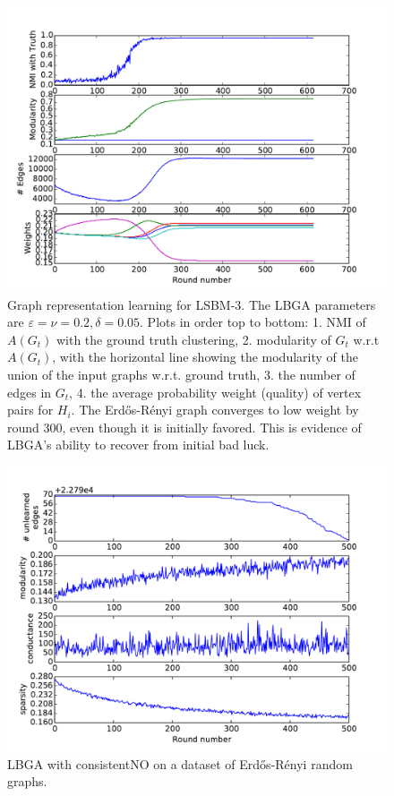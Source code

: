 \documentclass{IEEEtran}
\newcommand{\er}{Erd\H{o}s-R\'{e}nyi }
\begin{document}
\begin{figure}[t]
\begin{centering}
\includegraphics[width=\columnwidth]{figures/LBM-SNR=6+ER-consistentNO+NEF.pdf}
\par\end{centering}
\caption{Graph representation learning for LSBM-3. The LBGA parameters are
$\varepsilon=\nu=0.2, \delta=0.05$. Plots in order top to bottom: 1. NMI of
$A(G_t)$ with the ground truth clustering, 2. modularity of $G_t$ w.r.t
$A(G_t)$, with the horizontal line showing the modularity of the union of the
input graphs w.r.t. ground truth, 3. the number of edges in $G_t$, 4.  the
average probability weight (quality) of vertex pairs for $H_i$.  The \er graph
converges to low weight by round 300, even though it is initially favored. This
is evidence of LBGA's ability to recover from initial bad luck.} 
\label{fig:local-sbm} 
\end{figure}

\begin{figure}[t]
\begin{centering}
\includegraphics[width=\columnwidth]{figures/er-consistentNO.pdf}
\par\end{centering}
\caption{LBGA with consistentNO on a dataset of \er random graphs.} 
\label{fig:eronly}
\end{figure}
\end{document}
